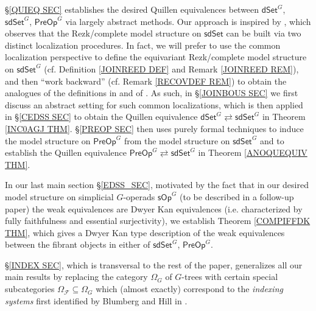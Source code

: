\documentclass[a4paper,10pt
 ,draft
]{article}%
\begin{document}
\S \ref{QUIEQ SEC} establishes the desired Quillen equivalences between 
$\mathsf{dSet}^G$, $\mathsf{sdSet}^G$, $\mathsf{PreOp}^G$
via largely abstract methods.
Our approach is inspired by 
\cite[Thm. 6.6]{CM13a}, which observes that the Rezk/complete model structure on $\mathsf{sdSet}$ can be built via two distinct localization procedures.
In fact, we will prefer to use the common localization perspective to define the equivariant Rezk/complete model structure on $\mathsf{sdSet}^G$ (cf. Definition \ref{JOINREED DEF} and Remark \ref{JOINREED REM}),
and then ``work backward'' (cf. Remark \ref{RECOVDEF REM}) to obtain the analogues of the definitions in \cite{CM13a} and of \cite[Thm. 6.6]{CM13a}.
%
As such, in \S \ref{JOINBOUS SEC} we first discuss an abstract setting for such common
localizations,
which is then applied in \S \ref{CEDSS SEC} to obtain
the Quillen equivalence
$\mathsf{dSet}^G \rightleftarrows \mathsf{sdSet}^G$
in Theorem \ref{INC0AGJ THM}.
\S \ref{PREOP SEC} then uses purely formal techniques to induce the model structure on
$\mathsf{PreOp}^G$ from the model structure on
$\mathsf{sdSet}^G$
and to establish the Quillen equivalence
$\mathsf{PreOp}^G \rightleftarrows \mathsf{sdSet}^G$
in Theorem \ref{ANOQUEQUIV THM}.

In our last main section \S \ref{EDSS_SEC},
motivated by the fact that in our desired model structure on simplicial $G$-operads $\mathsf{sOp}^G$
(to be described in a follow-up paper)
the weak equivalences are Dwyer Kan equivalences
(i.e. characterized by fully faithfulness and essential surjectivity), 
we establish Theorem \ref{COMPIFFDK THM}, which gives a Dwyer Kan type description of the weak equivalences 
between the fibrant objects in either of $\mathsf{sdSet}^G$, $\mathsf{PreOp}^G$.

\S \ref{INDEX SEC}, which is transversal to the rest of the paper, generalizes all our main results by replacing the category $\Omega_G$ of $G$-trees
with certain special subcategories
$\Omega_{\mathcal{F}} \subseteq \Omega_G$
which (almost exactly) correspond to the 
\textit{indexing systems} first identified
by Blumberg and Hill in \cite{BH15}.
\end{document}
